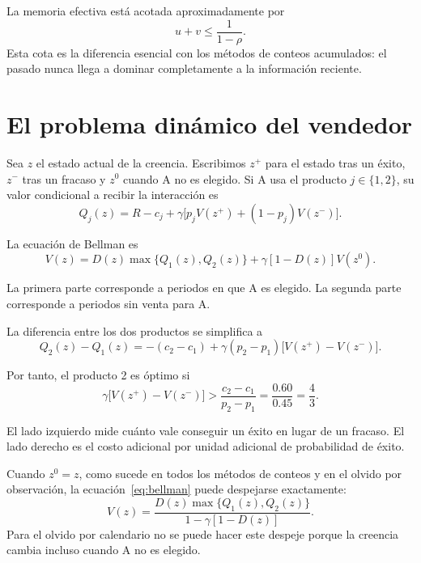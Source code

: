 \documentclass[11pt]{article}
\begin{document}
La memoria efectiva está acotada aproximadamente por
\begin{equation}
  u+v\le \frac{1}{1-\rho}.
\end{equation}
Esta cota es la diferencia esencial con los métodos de conteos acumulados: el
pasado nunca llega a dominar completamente a la información reciente.

\section{El problema dinámico del vendedor}

Sea $z$ el estado actual de la creencia. Escribimos $z^+$ para el estado tras
un éxito, $z^-$ tras un fracaso y $z^0$ cuando A no es elegido. Si A usa el
producto $j\in\{1,2\}$, su valor condicional a recibir la interacción es
\begin{equation}
  Q_j(z)=R-c_j+\gamma\big[p_jV(z^+)+(1-p_j)V(z^-)\big].
\end{equation}

La ecuación de Bellman es
\begin{equation}
  V(z)=D(z)\max\{Q_1(z),Q_2(z)\}
  +\gamma[1-D(z)]V(z^0).
  \label{eq:bellman}
\end{equation}

La primera parte corresponde a periodos en que A es elegido. La segunda parte
corresponde a periodos sin venta para A.

La diferencia entre los dos productos se simplifica a
\begin{equation}
Q_2(z)-Q_1(z)
=-(c_2-c_1)
+\gamma(p_2-p_1)\big[V(z^+)-V(z^-)\big].
\end{equation}

Por tanto, el producto 2 es óptimo si
\begin{equation}
  \gamma\big[V(z^+)-V(z^-)\big]
  >\frac{c_2-c_1}{p_2-p_1}
  =\frac{0.60}{0.45}=\frac{4}{3}.
  \label{eq:threshold}
\end{equation}

El lado izquierdo mide cuánto vale conseguir un éxito en lugar de un fracaso.
El lado derecho es el costo adicional por unidad adicional de probabilidad de
éxito.

Cuando $z^0=z$, como sucede en todos los métodos de conteos y en el olvido por
observación, la ecuación~\eqref{eq:bellman} puede despejarse exactamente:
\begin{equation}
  V(z)=
  \frac{D(z)\max\{Q_1(z),Q_2(z)\}}
       {1-\gamma[1-D(z)]}.
\end{equation}
Para el olvido por calendario no se puede hacer este despeje porque la
creencia cambia incluso cuando A no es elegido.
\end{document}
